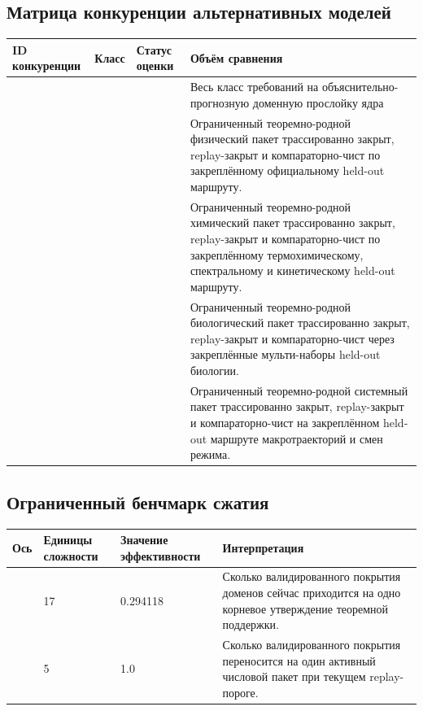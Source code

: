 \subsection{Матрица конкуренции альтернативных моделей}
\begin{center}
\begin{tabular}{@{}L{0.22\textwidth}L{0.16\textwidth}L{0.20\textwidth}L{0.34\textwidth}@{}}
\toprule
ID конкуренции & Класс & Статус оценки & Объём сравнения \\
\midrule
{} &  &  & Весь класс требований на объяснительно-прогнозную доменную прослойку ядра \\
 &  &  & Ограниченный теоремно-родной физический пакет трассированно закрыт, replay-закрыт и компараторно-чист по закреплённому официальному held-out маршруту. \\
 &  &  & Ограниченный теоремно-родной химический пакет трассированно закрыт, replay-закрыт и компараторно-чист по закреплённому термохимическому, спектральному и кинетическому held-out маршруту. \\
 &  &  & Ограниченный теоремно-родной биологический пакет трассированно закрыт, replay-закрыт и компараторно-чист через закреплённые мульти-наборы held-out биологии. \\
 &  &  & Ограниченный теоремно-родной системный пакет трассированно закрыт, replay-закрыт и компараторно-чист на закреплённом held-out маршруте макротраекторий и смен режима. \\
\bottomrule
\end{tabular}
\end{center}

\subsection{Ограниченный бенчмарк сжатия}
\begin{center}
\begin{tabular}{@{}L{0.24\textwidth}L{0.12\textwidth}L{0.13\textwidth}L{0.41\textwidth}@{}}
\toprule
Ось & Единицы сложности & Значение эффективности & Интерпретация \\
\midrule
{} & 17 & 0.294118 & Сколько валидированного покрытия доменов сейчас приходится на одно корневое утверждение теоремной поддержки. \\
 & 5 & 1.0 & Сколько валидированного покрытия переносится на один активный числовой пакет при текущем replay-пороге. \\
\bottomrule
\end{tabular}
\end{center}
